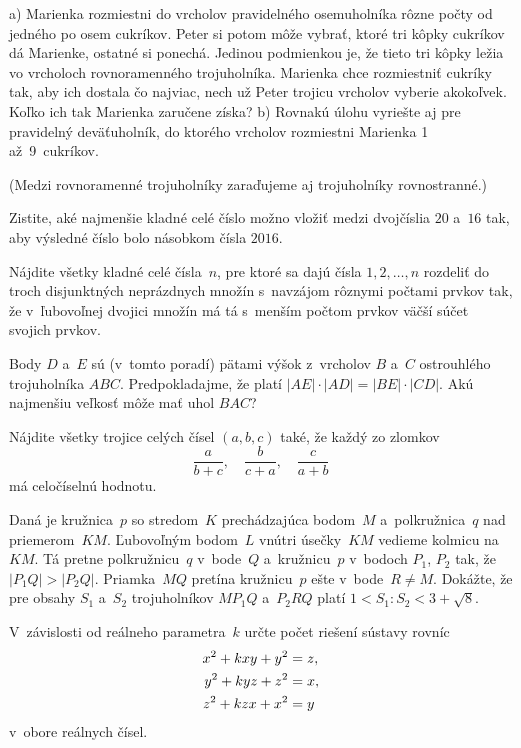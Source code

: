 {%
\ite a) Marienka rozmiestni do vrcholov pravidelného osemuholníka rôzne počty
od jedného po osem cukríkov. Peter si potom môže vybrať, ktoré tri kôpky
cukríkov dá Marienke, ostatné si ponechá. Jedinou podmienkou je, že tieto tri
kôpky ležia vo vrcholoch rovnoramenného trojuholníka. Marienka chce rozmiestniť cukríky tak, aby ich dostala čo najviac, nech už Peter
trojicu vrcholov vyberie akokoľvek. Koľko ich tak Marienka zaručene získa?
\ite b) Rovnakú úlohu vyriešte aj pre pravidelný deväťuholník, do ktorého
vrcholov rozmiestni Marienka 1 až~9~cukríkov. 

(Medzi rovnoramenné trojuholníky zaraďujeme aj trojuholníky rovnostranné.)}

{%
Zistite, aké najmenšie kladné celé číslo možno vložiť medzi dvojčíslia
$20$ a~$16$ tak, aby výsledné číslo bolo násobkom čísla $2016$.}

{%
Nájdite všetky kladné celé čísla~$n$, pre ktoré sa dajú čísla $1, 2, \dots, n$ rozdeliť
do troch disjunktných neprázdnych množín s~navzájom rôznymi počtami prvkov tak,
že v~ľubovoľnej dvojici množín má tá s~menším počtom prvkov väčší
súčet svojich prvkov.}

{%
Body $D$ a~$E$ sú (v~tomto poradí) pätami výšok z~vrcholov $B$ a~$C$
ostrouhlého trojuholníka $ABC$.
Predpokladajme, že platí $|AE| \cdot |AD| = |BE| \cdot |CD|$. Akú
najmenšiu veľkosť môže mať uhol $BAC$?}

{%
Nájdite všetky trojice celých čísel $(a, b, c)$ také, že každý zo zlomkov
$$
\frac {a}{b+c}, \quad \frac {b}{c+a}, \quad \frac {c}{a+b}
$$
má celočíselnú hodnotu.
}

{%
Daná je kružnica~$p$ so stredom~$K$ prechádzajúca bodom~$M$
a~polkružnica~$q$ nad priemerom~$KM$. Ľubovoľným bodom~$L$ vnútri úsečky~$KM$ vedieme kolmicu na~$KM$.
Tá pretne polkružnicu~$q$ v~bode~$Q$ a~kružnicu~$p$ v~bodoch $P_1$,
$P_2$ tak, že~${|P_1Q| > |P_2Q|}$. Priamka~$MQ$ pretína kružnicu~$p$ ešte
v~bode~$R\ne M$.
Dokážte, že pre obsahy $S_1$ a~$S_2$ trojuholníkov $MP_1Q$ a~$P_2RQ$
platí $1 <S_1: S_2 <3+ \sqrt8$.}

{%
V~závislosti od reálneho parametra~$k$ určte počet riešení sústavy rovníc
$$
\aligned
x^2+kxy+y^2&= z, \\
y^2+kyz+z^2&= x, \\
z^2+kzx+x^2&= y
\endaligned
$$
v~obore reálnych čísel.
}

